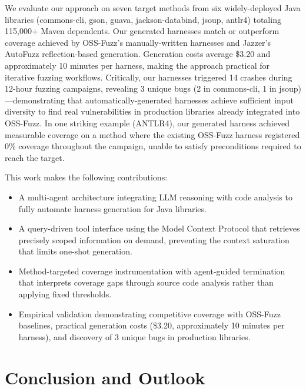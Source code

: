 \documentclass[sigconf,review,anonymous]{acmart}
\begin{document}
We evaluate our approach on seven target methods from six widely-deployed Java libraries (commons-cli, gson, guava, jackson-databind, jsoup, antlr4) totaling 115,000+ Maven dependents. Our generated harnesses match or outperform coverage achieved by OSS-Fuzz's manually-written harnesses and Jazzer's AutoFuzz reflection-based generation. Generation costs average \$3.20 and approximately 10 minutes per harness, making the approach practical for iterative fuzzing workflows. Critically, our harnesses triggered 14 crashes during 12-hour fuzzing campaigns, revealing 3 unique bugs (2 in commons-cli, 1 in jsoup)—demonstrating that automatically-generated harnesses achieve sufficient input diversity to find real vulnerabilities in production libraries already integrated into OSS-Fuzz. In one striking example (ANTLR4), our generated harness achieved measurable coverage on a method where the existing OSS-Fuzz harness registered 0\% coverage throughout the campaign, unable to satisfy preconditions required to reach the target.

This work makes the following contributions:
\begin{itemize}
    \item A multi-agent architecture integrating LLM reasoning with code analysis to fully automate harness generation for Java libraries.

    \item A query-driven tool interface using the Model Context Protocol that retrieves precisely scoped information on demand, preventing the context saturation that limits one-shot generation.

    \item Method-targeted coverage instrumentation with agent-guided termination that interprets coverage gaps through source code analysis rather than applying fixed thresholds.

    \item Empirical validation demonstrating competitive coverage with OSS-Fuzz baselines, practical generation costs (\$3.20, approximately 10 minutes per harness), and discovery of 3 unique bugs in production libraries.
\end{itemize}








\section{Conclusion and Outlook}
\end{document}
